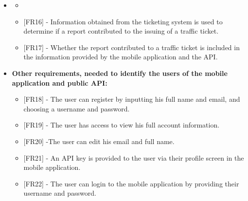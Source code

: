 \begin{itemize}[label={}]
    \noindent{}

\item \textbf{\goalTicketAnalysis}
    \begin{itemize}[label={}]
        \item \assumptionTicketingInfo
        \item {[FR16]} - Information obtained from the ticketing system is used to determine if a report contributed to the issuing of a traffic ticket.
        \item {[FR17]} - Whether the report contributed to a traffic ticket is included in the information provided by the mobile application and the API.
    \end{itemize}

\item \textbf{Other requirements, needed to identify the users of the mobile application and public API:}
    \begin{itemize}
        \item {[FR18]} - The user can register by inputting his full name and email, and choosing a username and password.
        \item {[FR19]} - The user has access to view his full account information.
        \item {[FR20]} -The user can edit his email and full name.
        \item {[FR21]} - An API key is provided to the user via their profile screen in the mobile application.
        \item {[FR22]} - The user can login to the mobile application by providing their username and password.
    \end{itemize}
    
\end{itemize}

